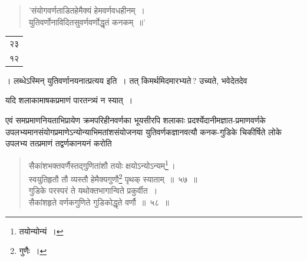\documentclass[10pt, openany]{book}
\begin{document}
{{\newpage

\begin{quote}    
{\qt 'संयोगवर्णताडितहेमैक्यं हेमवर्णवधहीनम्~। \\
 युतिवर्णोनाविदितसुवर्णवर्णोद्धृतं कनकम्~॥'}
\end{quote}

{\begin{tabular}{r}२३\\ १२\end{tabular}। लब्धेऽस्मिन् युतिवर्णानयनात्प्रत्यय इति~। तत् किमर्थमिदमारभ्यते\,? उच्यते, भवेदेतदेव}
{यदि शलाकामाषकप्रमाणं पारतन्त्र्यं न स्यात्~।}
\vspace{3mm}

{एवं समप्रमाणनियताभिप्रायेण क्रमपरिहीनवर्णका भूयसीरपि शलाकाः
प्रदर्श्येदानीमज्ञात-प्रमाणवर्णके उपलभ्यमानसंयोगप्रमाणेऽन्योन्याभिमतांशसंयोजनया
युतिवर्णकज्ञानवत्यौ कनक-गुडिके चिकीर्षिते लोके उपलभ्य तत्प्रमाणं तद्वर्णकानयनं करोति\textemdash}

 \label{57}
\begin{quote}
    
{\bs सैकांशभक्तवर्णैस्तद्गुणितांशौ तयोः क्षयोऽन्योऽन्यम्\renewcommand{\thefootnote}{\s २}\footnote{\s तयोन्योन्यं~।}\,। \\
 स्वयुतिहृतौ तौ व्यस्तौ हेमैक्यगुणौ\renewcommand{\thefootnote}{\s ३}\footnote{\s *गुणैः~।}  पृथक् स्याताम्~॥~५७~॥ \\
 गुडिके परस्परं ते यथोक्तभागान्विते प्रकुर्वीत~। \\
 सैकांशहृते वर्णकगुणिते गुडिकोद्धृते वर्णौ~॥~५८~॥}\end{quote}

}}
\end{document}
